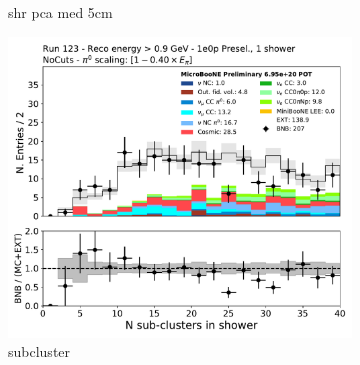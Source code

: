 \begin{figure}[H]
\begin{subfigure}{0.3\textwidth}
    \caption{shr pca med 5cm}
    \end{subfigure}
    \begin{subfigure}{0.3\textwidth}
    \includegraphics[width=1.0\textwidth]{1e0p/High_E_Sideband/subcluster.pdf}
    \caption{subcluster}
    \end{subfigure}
    \caption{} 
    \label{fig:HE_1eNp_1}
\end{figure}

